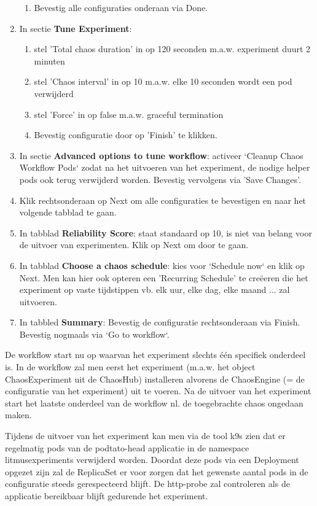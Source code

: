 \begin{enumerate}
\begin{enumerate}
            \item Bevestig alle configuraties onderaan via Done.  
        \end{enumerate}
    \item In sectie {\bf Tune Experiment}:
        \begin{enumerate}
            \item stel 'Total chaos duration' in op 120 seconden m.a.w. experiment duurt 2 minuten
            \item stel 'Chaos interval' in op 10 m.a.w. elke 10 seconden wordt een pod verwijderd
            \item stel 'Force' in op false m.a.w. graceful termination \autocite{Dinesh2018a}
            \item Bevestig configuratie door op 'Finish' te klikken.
        \end{enumerate}  
    \item In sectie {\bf Advanced options to tune workflow}: activeer `Cleanup Chaos Workflow Pods` zodat na het uitvoeren van het experiment, de nodige helper pods ook terug verwijderd worden.
    Bevestig vervolgens via 'Save Changes'.
    \item Klik rechtsonderaan op Next om alle configuraties te bevestigen en naar het volgende tabblad te gaan.
    \item In tabblad {\bf Reliability Score}: staat standaard op 10, is niet van belang voor de uitvoer van experimenten. Klik op Next om door te gaan.
    \item In tabblad {\bf Choose a chaos schedule}: kies voor `Schedule now` en klik op Next. Men kan hier ook opteren een 'Recurring Schedule' te creëeren die het experiment op vaste tijdstippen vb. elk uur, elke dag, elke maand ... zal uitvoeren.
    \item In tabbled {\bf Summary}: Bevestig de configuratie rechtsonderaan via Finish. Bevestig nogmaals via `Go to workflow`.  
\end{enumerate}

De workflow start nu op waarvan het experiment slechts één specifiek onderdeel is. In de workflow zal men eerst het experiment (m.a.w. het object ChaosExperiment uit de ChaosHub) installeren alvorens de ChaosEngine (= de configuratie van het experiment) uit te voeren. Na de uitvoer van het experiment start het laatste onderdeel van de workflow nl. de toegebrachte chaos ongedaan maken.

Tijdens de uitvoer van het experiment kan men via de tool k9s zien dat er regelmatig pods van de podtato-head applicatie in de namespace litmusexperiments verwijderd worden. Doordat deze pods via een Deployment opgezet zijn zal de ReplicaSet er voor zorgen dat het gewenste aantal pods in de configuratie steeds gerespecteerd blijft. De http-probe zal controleren als de applicatie bereikbaar blijft gedurende het experiment.
 
